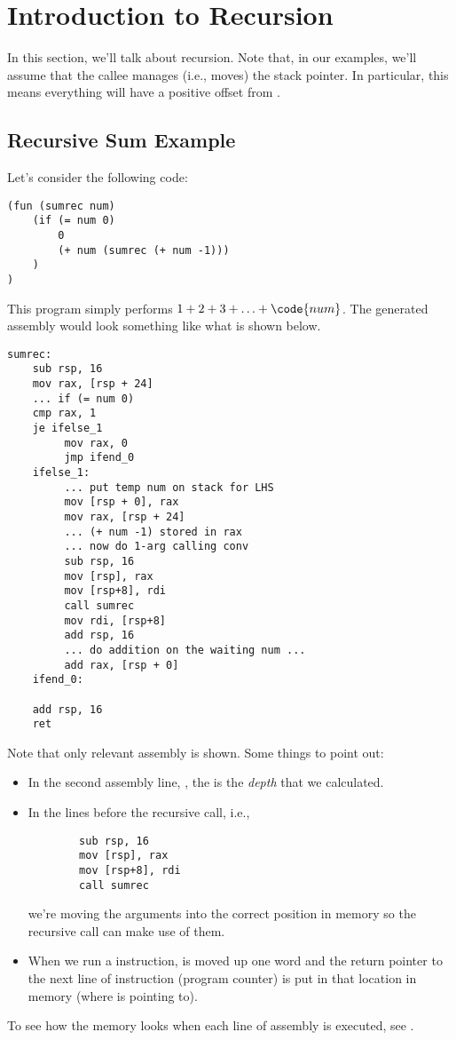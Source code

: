 \documentclass[letterpaper]{article}
\begin{document}
\section{Introduction to Recursion}
In this section, we'll talk about recursion. Note that, in our examples, we'll assume that the callee manages (i.e., moves) the stack pointer. In particular, this means everything will have a positive offset from .

\subsection{Recursive Sum Example}
Let's consider the following code:
\begin{verbatim}
(fun (sumrec num)
    (if (= num 0)
        0
        (+ num (sumrec (+ num -1)))
    )
)\end{verbatim}
This program simply performs $1 + 2 + 3 + \hdots + \code{num}$. The generated assembly would look something like what is shown below. 
\begin{verbatim}
sumrec:
    sub rsp, 16
    mov rax, [rsp + 24]
    ... if (= num 0)
    cmp rax, 1
    je ifelse_1
         mov rax, 0
         jmp ifend_0
    ifelse_1:
         ... put temp num on stack for LHS
         mov [rsp + 0], rax
         mov rax, [rsp + 24]
         ... (+ num -1) stored in rax
         ... now do 1-arg calling conv
         sub rsp, 16
         mov [rsp], rax
         mov [rsp+8], rdi
         call sumrec
         mov rdi, [rsp+8]
         add rsp, 16
         ... do addition on the waiting num ...
         add rax, [rsp + 0]
    ifend_0:
    
    add rsp, 16
    ret\end{verbatim}
Note that only relevant assembly is shown. Some things to point out: 
\begin{itemize}
    \item In the second assembly line, , the  is the \emph{depth} that we calculated. 
    \item In the lines before the recursive call, i.e., 
    \begin{verbatim}
        sub rsp, 16
        mov [rsp], rax
        mov [rsp+8], rdi
        call sumrec\end{verbatim}
    we're moving the arguments into the correct position in memory so the recursive call can make use of them. 
    \item When we run a  instruction,  is moved up one word and the return pointer to the next line of instruction (program counter) is put in that location in memory (where  is pointing to). 
\end{itemize}
To see how the memory looks when each line of assembly is executed, see .
\end{document}
